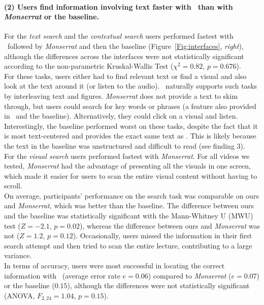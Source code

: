 \paragraph{(2) Users find information involving text faster with \systemname\ than with \emph{Monserrat} or the baseline.}
For the \textit{text search} and  the \textit{contextual search} users performed fastest with \systemname\  followed by \textit{Monserrat} and then the baseline (Figure~\ref{Fig:interfaces}, \textit{right}), although the differences across the interfaces were not statistically significant according to the non-parametric Kruskal-Wallis Test ($\chi^2=0.82$,
$p=0.676$).\\ 
For these tasks, users either had to find relevant text or find a visual and also look at the text around it (or listen to the audio). \systemname\ naturally supports such tasks by  interleaving text and figures. \textit{Monserrat} does not provide a text to skim through, but users could search for key words or phrases (a feature also provided in \systemname\ and the baseline). Alternatively, they could click on a visual and listen. Interestingly, the baseline performed worst on these tasks, despite the fact that it is most text-centered and  provides the exact same text as \systemname . This is likely because the text in the baseline was unstructured and difficult to read (see finding 3).\\
For the \textit{visual search} users performed fastest with \textit{Monserrat}. For
all videos we tested, \textit{Monserrat} had the advantage of presenting all the visuals
in one screen, which made it easier for users to scan the entire visual content
without having to scroll.\\
On average, participants' performance on the search task was comparable on
ours and \textit{Monserrat}, which was better than the baseline. The difference between
ours and the baseline was statistically significant with the Mann-Whitney
U (MWU) test ($Z=-2.1$, $p=0.02$), whereas the difference between ours and
\textit{Monserrat} was not ($Z=1.2$, $p=0.12$). Occasionally, users missed the information in their first search attempt and  then tried to scan the entire lecture, contributing to a large variance.  \\
In terms of accuracy, users were most successful in locating the correct information with \systemname\ (average error rate $e=0.06$) compared to \textit{Monserrat} ($e=0.07$) or the baseline ($0.15$), although the differences were not statistically significant (ANOVA, $F_{2,24}=1.04$, $p=0.15$).

